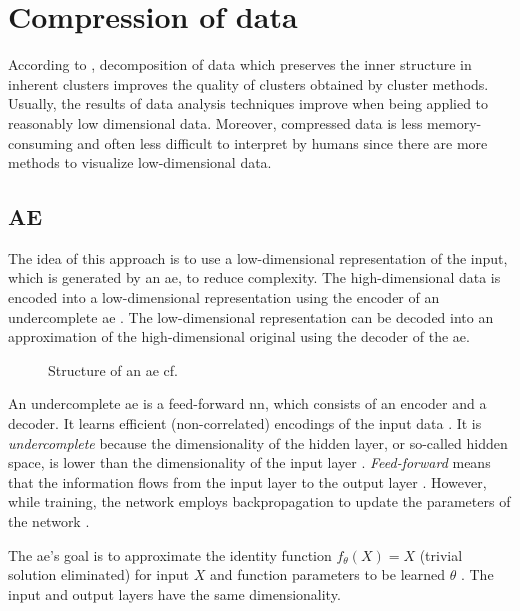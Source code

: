 \section{Compression of data}\label{subsec:compression}

According to \citeauthor{clusteringDocs2020}, decomposition of data which preserves the inner structure in inherent clusters 
improves the quality of clusters obtained by cluster methods.
Usually, the results of data analysis techniques improve when being applied to reasonably low dimensional data.
Moreover, compressed data is less memory-consuming and often less difficult to interpret by humans 
since there are more methods to visualize low-dimensional data.

\subsection{AE}\label{subsec:autoencoder}

The idea of this approach is to use a low-dimensional representation of the input, which is generated by an \ac{ae}, to reduce complexity.
The high-dimensional data is encoded into a low-dimensional representation using the encoder of an undercomplete \ac{ae} \cite{autoencoder2020}.
The low-dimensional representation can be decoded into an approximation of the high-dimensional original using the decoder of the \ac{ae}.

\begin{figure}[h] %
    \centering
    
    \caption{Structure of an \ac{ae} cf. \cite{autoencoder2020}}
    \label{fig:ae}
\end{figure}

An undercomplete \ac{ae} is a feed-forward \ac{nn}, which consists of an encoder and a decoder.
It learns efficient (non-correlated) encodings of the input data \cite{autoencoder2020}.
It is \textit{undercomplete} because the dimensionality of the hidden layer, or so-called hidden space, 
is lower than the dimensionality of the input layer \cite{seminar_ies}.
\textit{Feed-forward} means that the information flows from the input layer to the output layer \cite{seminar_ies}.
However, while training, the network employs backpropagation to update the parameters of the network \cite{seminar_ies}.

The \ac{ae}'s goal is to approximate the identity function $f_\theta(X) = X$ (trivial solution eliminated) for input $X$ and 
function parameters to be learned $\theta$ \cite{seminar_ies}.
The input and output layers have the same dimensionality.

